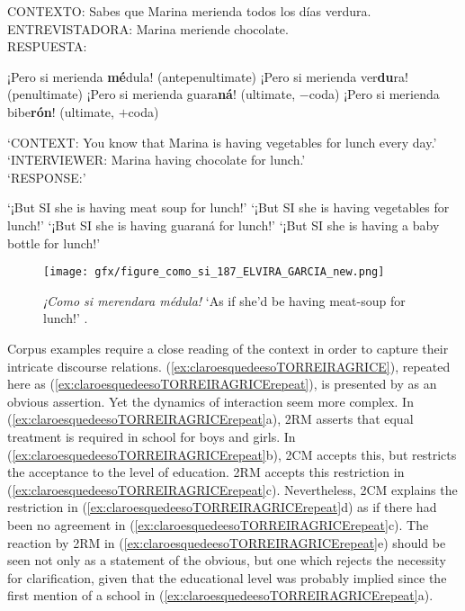 \begin{exe}
	\ex  \label{ex:perosiVX2}  CONTEXTO: Sabes que Marina merienda todos los días verdura. \\
	ENTREVISTADORA: Marina meriende chocolate. \\
	RESPUESTA: 	
	\begin{xlist}
		\ex ¡Pero si merienda \textbf{mé}dula! (antepenultimate) 
		\ex ¡Pero si merienda ver\textbf{du}ra! (penultimate) 
		\ex ¡Pero si merienda guara\textbf{ná}! (ultimate, $-$coda)
		\ex ¡Pero si merienda bibe\textbf{rón}! (ultimate, $+$coda)  
	\end{xlist}
	
	\glt `CONTEXT: You know that Marina is having vegetables for lunch every day.' \\
	`INTERVIEWER: Marina having chocolate for lunch.' \\
	`RESPONSE:' 
	\begin{xlist}
		\ex `¡But SI she is having meat soup for lunch!' 
		\ex `¡But SI she is having vegetables for lunch!' 
		\ex `¡But SI she is having guaraná for lunch!' 
		\ex `¡But SI she is having a baby bottle for lunch!' 
	\end{xlist}
\end{exe}

\begin{figure}
	\texttt{[image: gfx/figure\_como\_si\_187\_ELVIRA\_GARCIA\_new.png]}
	\caption{\textit{¡Como si merendara médula!} `As if she'd be having meat-soup for lunch!' 
		\citep[187]{ElviraGarcia.2016}.}\label{fig:comosiVsubFIGURE189}
\end{figure}

\largerpage Corpus examples require a close reading of the context in order to capture their intricate discourse relations. (\ref{ex:claroesquedeesoTORREIRAGRICE}), repeated here as (\ref{ex:claroesquedeesoTORREIRAGRICErepeat}), is presented by \citet{TorreiraGrice.2018} as an obvious assertion. Yet the dynamics of interaction seem more complex. In (\ref{ex:claroesquedeesoTORREIRAGRICErepeat}a), 2RM asserts that equal treatment is required in school for boys and girls. In (\ref{ex:claroesquedeesoTORREIRAGRICErepeat}b), 2CM accepts this, but restricts the acceptance to the level of education. 2RM accepts this restriction in (\ref{ex:claroesquedeesoTORREIRAGRICErepeat}c). Nevertheless, 2CM explains the restriction in (\ref{ex:claroesquedeesoTORREIRAGRICErepeat}d) as if there had been no agreement in (\ref{ex:claroesquedeesoTORREIRAGRICErepeat}c). The reaction by 2RM in (\ref{ex:claroesquedeesoTORREIRAGRICErepeat}e) should be seen not only as a statement of the obvious, but one which rejects the necessity for clarification, given that the educational level was probably implied since the first mention of a school in (\ref{ex:claroesquedeesoTORREIRAGRICErepeat}a).

